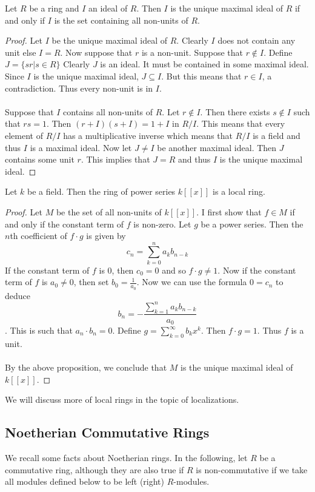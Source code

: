 \documentclass[a4paper]{article}
\begin{document}
\begin{prp}{}{} Let $R$ be a ring and $I$ an ideal of $R$. Then $I$ is the unique maximal ideal of $R$ if and only if $I$ is the set containing all non-units of $R$. \tcbline
\begin{proof}
Let $I$ be the unique maximal ideal of $R$. Clearly $I$ does not contain any unit else $I=R$. Now suppose that $r$ is a non-unit. Suppose that $r\notin I$. Define $J=\{sr|s\in R\}$ Clearly $J$ is an ideal. It must be contained in some maximal ideal. Since $I$ is the unique maximal ideal, $J\subseteq I$. But this means that $r\in I$, a contradiction. Thus every non-unit is in $I$. \\~\\
Suppose that $I$ contains all non-units of $R$. Let $r\notin I$. Then there exists $s\notin I$ such that $rs=1$. Then $(r+I)(s+I)=1+I$ in $R/I$. This means that every element of $R/I$ has a multiplicative inverse which means that $R/I$ is a field and thus $I$ is a maximal ideal. Now let $J\neq I$ be another maximal ideal. Then $J$ contains some unit $r$. This implies that $J=R$ and thus $I$ is the unique maximal ideal. 
\end{proof}
\end{prp}

\begin{eg}{}{} Let $k$ be a field. Then the ring of power series $k[[x]]$ is a local ring. \tcbline
\begin{proof}
Let $M$ be the set of all non-units of $k[[x]]$. I first show that $f\in M$ if and only if the constant term of $f$ is non-zero. Let $g$ be a power series. Then the $n$th coefficient of $f\cdot g$ is given by $$c_n=\sum_{k=0}^na_kb_{n-k}$$ If the constant term of $f$ is $0$, then $c_0=0$ and so $f\cdot g\neq 1$. Now if the constant term of $f$ is $a_0\neq 0$, then set $b_0=\frac{1}{a_0}$. Now we can use the formula $0=c_n$ to deduce $$b_n=-\frac{\sum_{k=1}^na_kb_{n-k}}{a_0}$$. This is such that $a_n\cdot b_n=0$. Define $g=\sum_{k=0}^\infty b_kx^k$. Then $f\cdot g=1$. Thus $f$ is a unit. \\~\\

By the above proposition, we conclude that $M$ is the unique maximal ideal of $k[[x]]$. 
\end{proof}
\end{eg}

We will discuss more of local rings in the topic of localizations. 

\subsection{Noetherian Commutative Rings}
We recall some facts about Noetherian rings. In the following, let $R$ be a commutative ring, although they are also true if $R$ is non-commutative if we take all modules defined below to be left (right) $R$-modules. 
\end{document}
